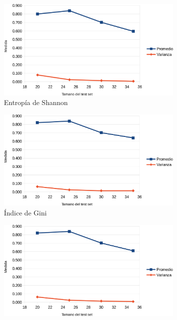 \documentclass[a4paper]{article}
\begin{document}
  \begin{figure}[ht]
    \begin{subfigure}{.5\textwidth}
      \centering
      \includegraphics[width=\linewidth]{img/test-set-shannon.png}
      \caption{Entropía de Shannon}
      \label{fig21:sfig1}
    \end{subfigure}%
    \begin{subfigure}{.5\textwidth}
      \centering
      \includegraphics[width=\linewidth]{img/test-set-gini.png}
      \caption{Índice de Gini}
      \label{fig21:sfig2}
    \end{subfigure}
    \begin{subfigure}{.5\textwidth}
      \centering
      \includegraphics[width=\linewidth]{img/test-set-rf-shannon.png}

\end{subfigure}
\end{figure}
\end{document}
